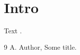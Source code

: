 \documentclass{article}
\begin{document}
\section{Intro}
Text \cite{a}.
\begin{thebibliography}{9}
 A. Author, Some title.
\end{thebibliography}
\end{document}

